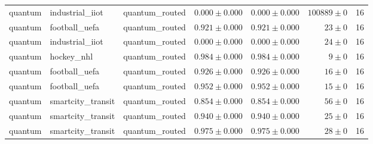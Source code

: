 \begin{table}[htbp]
\begin{tabular}{l l l r r r r}
quantum & industrial\_iiot & quantum\_routed & $0.000\pm0.000$ & $0.000\pm0.000$ & $100889\pm0$ & 16 \\
quantum & football\_uefa & quantum\_routed & $0.921\pm0.000$ & $0.921\pm0.000$ & $23\pm0$ & 16 \\
quantum & industrial\_iiot & quantum\_routed & $0.000\pm0.000$ & $0.000\pm0.000$ & $24\pm0$ & 16 \\
quantum & hockey\_nhl & quantum\_routed & $0.984\pm0.000$ & $0.984\pm0.000$ & $9\pm0$ & 16 \\
quantum & football\_uefa & quantum\_routed & $0.926\pm0.000$ & $0.926\pm0.000$ & $16\pm0$ & 16 \\
quantum & football\_uefa & quantum\_routed & $0.952\pm0.000$ & $0.952\pm0.000$ & $15\pm0$ & 16 \\
quantum & smartcity\_transit & quantum\_routed & $0.854\pm0.000$ & $0.854\pm0.000$ & $56\pm0$ & 16 \\
quantum & smartcity\_transit & quantum\_routed & $0.940\pm0.000$ & $0.940\pm0.000$ & $25\pm0$ & 16 \\
quantum & smartcity\_transit & quantum\_routed & $0.975\pm0.000$ & $0.975\pm0.000$ & $28\pm0$ & 16 \\
\hline
\end{tabular}
\end{table}
